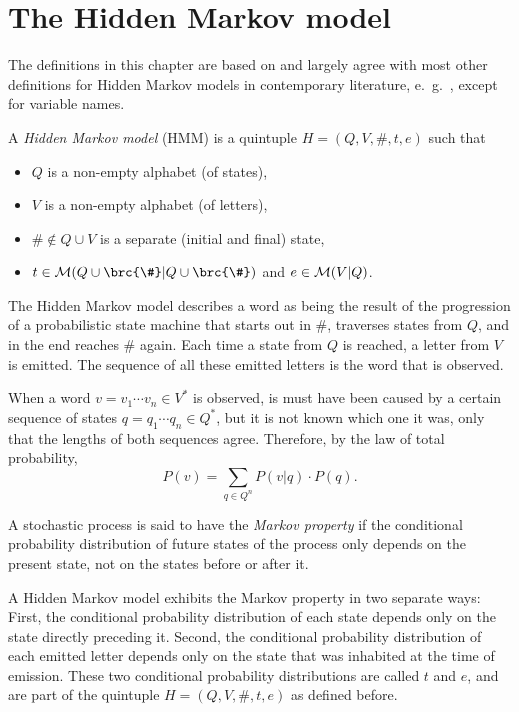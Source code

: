 \chapter{The Hidden Markov model}

The definitions in this chapter are based on \cite{vogler2015} and largely
agree with most other definitions for Hidden Markov models in contemporary
literature, e.~g.~\cite[pp.~210]{jm09}, except for variable names.

\begin{definition}
 A \emph{Hidden Markov model} (HMM) is a quintuple $H = (Q,V,\#,t,e)$ such that
 \begin{itemize}\setlength\itemsep{-0.3em}
  \item $Q$ is a non-empty alphabet (of states),
  \item $V$ is a non-empty alphabet (of letters),
  \item $\#\notin Q\cup V$ is a separate (initial and final) state,
  \item $t\in\um(Q\cup\brc{\#}|Q\cup\brc{\#})$ and $e\in\mathcal M(V|Q)$.
 \end{itemize}
\end{definition}

The Hidden Markov model describes a word as being the result of the progression
of a probabilistic state machine that starts out in $\#$, traverses states from
$Q$, and in the end reaches $\#$ again. Each time a state from $Q$ is reached,
a letter from $V$ is emitted. The sequence of all these emitted letters is the
word that is observed.

When a word $v = v_1\cdots v_n\in V^*$ is observed, is must have been caused by
a certain sequence of states $q = q_1\cdots q_n\in Q^*$, but it is not known
which one it was, only that the lengths of both sequences agree. Therefore, by
the law of total probability,
\[
 P(v) = \sum_{q\in Q^n} P(v|q) \cdot P(q).
\]

\begin{definition}
 A stochastic process is said to have the \emph{Markov property} if the
 conditional probability distribution of future states of the process only
 depends on the present state, not on the states before or after it.
\end{definition}

A Hidden Markov model exhibits the Markov property in two separate ways: First,
the conditional probability distribution of each state depends only on the
state directly preceding it. Second, the conditional probability distribution
of each emitted letter depends only on the state that was inhabited at the time
of emission. These two conditional probability distributions are called $t$ and
$e$, and are part of the quintuple $H=(Q,V,\#,t,e)$ as defined before.

